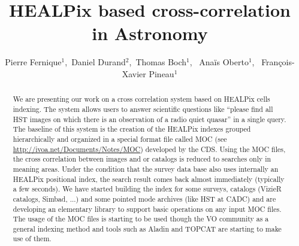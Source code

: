 \documentclass[11pt,twoside]{article}
\begin{document}
\title{HEALPix based cross-correlation in Astronomy}
\author{Pierre Fernique$^1$,\ Daniel Durand$^2$,\ Thomas Boch$^1$, \ Ana\"is Oberto$^1$, \ Fran\c{c}ois-Xavier Pineau$^1$
}



\begin{abstract}
We are presenting our work on a cross correlation system based on
        HEALPix cells indexing. The system allows users to answer
        scientific
        questions like ``please find all HST images on which there is an
        observation of a radio quiet quasar'' in a single query. The baseline
        of this system is the creation of the HEALPix indexes grouped
        hierarchically and organized in a special format file called MOC
        (see \url{http://ivoa.net/Documents/Notes/MOC}) developed by the CDS. Using the MOC files,
         the cross correlation between images and or catalogs is reduced to searches only in meaning areas. Under the condition that the
        survey data base also uses internally an HEALPix positional index,
        the search result comes back almost immediately (typically a few
        seconds).
        We have started building the index for some surveys, catalogs (VizieR
        catalogs, Simbad, ...) and some pointed mode archives (like HST at
        CADC) and are developing an elementary library to support basic operations
        on any input MOC files. The usage of the MOC files is starting to
        be used though the VO community as a general indexing method and
        tools such as Aladin and TOPCAT are starting to
        make use of them.

\end{abstract}
\end{document}
